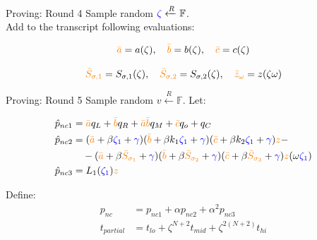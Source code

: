 \documentclass{zkdl-presentation-template}
\begin{document}
    \begin{frame} {Proving: Round 4}
        Sample random $\textcolor{blue}{\zeta} \xleftarrow{R} \mathbb{F}$. \\
        \vspace{1em}
        Add to the transcript following evaluations:

        \begin{equation*}
            \textcolor{orange}{\bar{a}} = a(\zeta), \quad \textcolor{orange}{\bar{b}} = b(\zeta), \quad \textcolor{orange}{\bar{c}} = c(\zeta)
        \end{equation*}

        \begin{equation*}
            \textcolor{orange}{\bar{S}_{\sigma,1}} = S_{\sigma,1}(\zeta), \quad \textcolor{orange}{\bar{S}_{\sigma,2}} = S_{\sigma,2}(\zeta), \quad \textcolor{orange}{\bar{z}_{\omega}} = z(\zeta \omega)
        \end{equation*}
    \end{frame}

    \begin{frame} {Proving: Round 5}
        Sample random $v \xleftarrow{R}\mathbb{F}$. Let:

        \begin{align*}
            \hat{p}_{nc1} &= \textcolor{orange}{\bar{a}}q_L + \textcolor{orange}{\bar{b}}q_R + \textcolor{orange}{\bar{a}}\textcolor{orange}{\bar{b}}q_M + \textcolor{orange}{\bar{c}}q_o + q_C \\
            \hat{p}_{nc2} &= (\textcolor{orange}{\bar{a}} + \beta \textcolor{blue}{\zeta_1} + \textcolor{blue}{\gamma})(\textcolor{orange}{\bar{b}} + \beta k_1 \textcolor{blue}{\zeta_1} + \textcolor{blue}{\gamma})(\textcolor{orange}{\bar{c}} + \beta k_2 \textcolor{blue}{\zeta_1} + \textcolor{blue}{\gamma}) \textcolor{orange}{z} - \\
            &\quad - (\textcolor{orange}{\bar{a}} + \beta \textcolor{orange}{\bar{S}_{\sigma_1}} + \textcolor{blue}{\gamma})(\textcolor{orange}{\bar{b}} + \beta \textcolor{orange}{\bar{S}_{\sigma_2}} + \textcolor{blue}{\gamma})(\textcolor{orange}{\bar{c}} + \beta \textcolor{orange}{\bar{S}_{\sigma_3}} + \textcolor{blue}{\gamma}) \textcolor{orange}{z}(\omega \textcolor{blue}{\zeta_1}) \\
            \hat{p}_{nc3} &= L_1(\textcolor{blue}{\zeta_1})\textcolor{orange}{z}
        \end{align*}
     
        Define:
        \begin{align*}
            p_{nc} &= p_{nc1} + \alpha p_{nc2} + \alpha^2 p_{nc3} \\
            t_{partial} &= t_{lo} + \zeta^{N+2}t_{mid} + \zeta^{2(N+2)}t_{hi}
        \end{align*}
    \end{frame}
\end{document}
